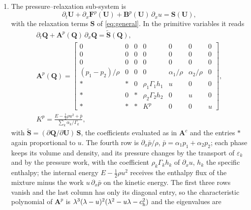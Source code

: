 \begin{enumerate}
The characteristic speeds are the flow velocity and zero. The volume fraction is transported only by this sub-system; in
the pressure--relaxation sub-system it changes only through the relaxation terms.
\item The pressure--relaxation sub-system is
\begin{equation}
\partial_t\mathbf U+\partial_x\mathbf F^p(\mathbf U)+\mathbf B^p(\mathbf U)\,\partial_xu=\mathbf S(\mathbf U),
\label{eq:pressure_sub}
\end{equation}
with the relaxation terms $\mathbf S$ of \eqref{eq:general}. In the primitive variables it reads
\begin{equation}
\begin{gathered}
\partial_t\mathbf Q+\mathbf A^p(\mathbf Q)\,\partial_x\mathbf Q=\tilde{\mathbf S}(\mathbf Q),\\
\mathbf A^p(\mathbf Q)=\begin{bmatrix}
0&0&0&0&0&0&0\\
0&0&0&0&0&0&0\\
0&0&0&0&0&0&0\\
(p_1-p_2)/\rho&0&0&0&\alpha_1/\rho&\alpha_2/\rho&0\\
\ast&\ast&0&\rho_1\Gamma_1h_1&u&0&0\\
\ast&0&\ast&\rho_2\Gamma_2h_2&0&u&0\\
\ast&\ast&\ast&K^p&0&0&u
\end{bmatrix},\\
K^p=\frac{E-\tfrac12\rho u^2+\bar p}{\sum_k\alpha_k/\Gamma_k},
\end{gathered}
\label{eq:Ap}
\end{equation}
with $\tilde{\mathbf S}=(\partial\mathbf Q/\partial\mathbf U)\,\mathbf S$, the coefficients evaluated as in $\mathbf A^c$ and the entries $\ast$ again proportional to $u$. The fourth row is $\partial_x\bar p/\rho$,
$\bar p=\alpha_1p_1+\alpha_2p_2$; each phase keeps its volume and density, and its pressure changes by the transport of $\varepsilon_k$ and by
the pressure work, with the coefficient $\rho_k\Gamma_kh_k$ of $\partial_xu$, $h_k$ the specific enthalpy; the internal energy $E-\tfrac12\rho u^2$ receives
the enthalpy flux of the mixture minus the work $u\,\partial_x\bar p$ on the kinetic energy. The first three rows vanish and the last
column has only its diagonal entry, so the characteristic polynomial of $\mathbf A^p$ is $\lambda^3(\lambda-u)^2(\lambda^2-u\lambda-c_{\rm h}^2)$ and the
eigenvalues are
\begin{equation}
\begin{gathered}

\end{gathered}
\end{equation}
\end{enumerate}
